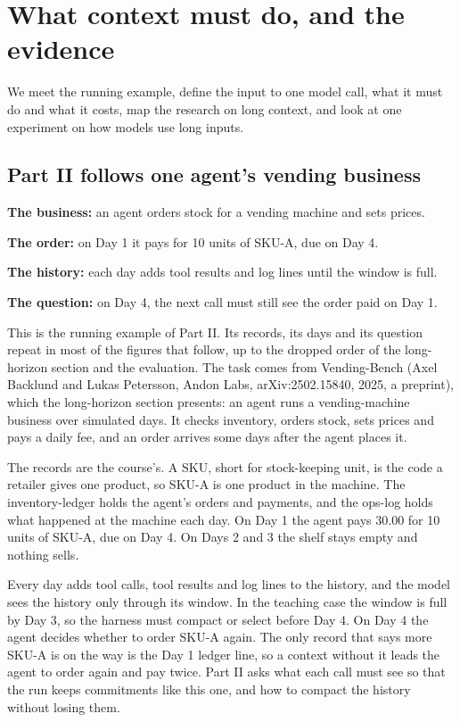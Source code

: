 \section{What context must do, and the evidence}
\label{sec:row-0}

We meet the running example, define the input to one model call, what it must do and what it costs, map the research on long context, and look at one experiment on how models use long inputs.

\subsection{Part II follows one agent's vending business}
\label{sec:it-5-0}

\bi
\item \textbf{The business:} an agent orders stock for a vending machine and sets prices.
\item \textbf{The order:} on Day 1 it pays for 10 units of SKU-A, due on Day 4.
\item \textbf{The history:} each day adds tool results and log lines until the window is full.
\item \textbf{The question:} on Day 4, the next call must still see the order paid on Day 1.
\ei

This is the running example of Part II. Its records, its days and its question repeat in most of the figures that follow, up to the dropped order of the long-horizon section and the evaluation. The task comes from Vending-Bench (Axel Backlund and Lukas Petersson, Andon Labs, arXiv:2502.15840, 2025, a preprint), which the long-horizon section presents: an agent runs a vending-machine business over simulated days. It checks inventory, orders stock, sets prices and pays a daily fee, and an order arrives some days after the agent places it.

The records are the course's. A SKU, short for stock-keeping unit, is the code a retailer gives one product, so SKU-A is one product in the machine. The inventory-ledger holds the agent's orders and payments, and the ops-log holds what happened at the machine each day. On Day 1 the agent pays 30.00 for 10 units of SKU-A, due on Day 4. On Days 2 and 3 the shelf stays empty and nothing sells.

Every day adds tool calls, tool results and log lines to the history, and the model sees the history only through its window. In the teaching case the window is full by Day 3, so the harness must compact or select before Day 4. On Day 4 the agent decides whether to order SKU-A again. The only record that says more SKU-A is on the way is the Day 1 ledger line, so a context without it leads the agent to order again and pay twice. Part II asks what each call must see so that the run keeps commitments like this one, and how to compact the history without losing them.

